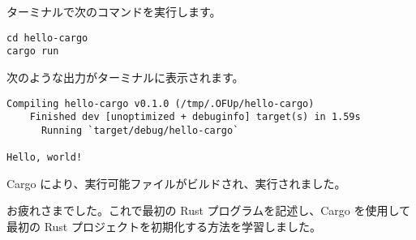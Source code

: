 ターミナルで次のコマンドを実行します。


\begin{lstlisting}[numbers=none]
cd hello-cargo
cargo run
\end{lstlisting}

次のような出力がターミナルに表示されます。

\begin{lstlisting}[numbers=none]
  Compiling hello-cargo v0.1.0 (/tmp/.OFUp/hello-cargo)
    Finished dev [unoptimized + debuginfo] target(s) in 1.59s
      Running `target/debug/hello-cargo`

Hello, world!
\end{lstlisting}

Cargo により、実行可能ファイルがビルドされ、実行されました。

お疲れさまでした。これで最初の Rust プログラムを記述し、Cargo を使用して最初の Rust プロジェクトを初期化する方法を学習しました。







